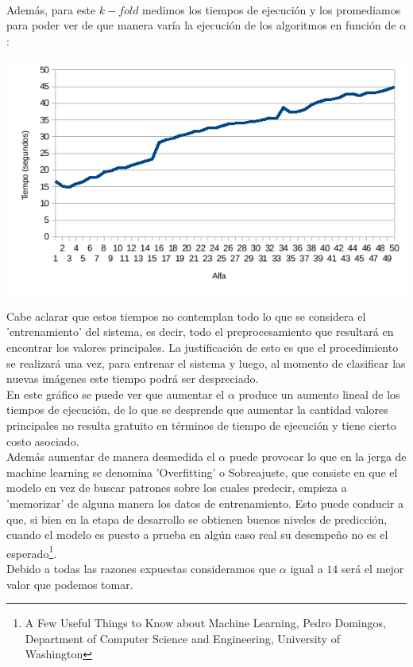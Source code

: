 \\
Además, para este $k-fold$ medimos los tiempos de ejecución y los promediamos para poder ver de que manera varía la ejecución de los algoritmos en función de $\alpha$:

\begin{center}
\includegraphics[scale=0.6]{nuevosResultados/pca/alfa/temp.png}
\end{center}


Cabe aclarar que estos tiempos no contemplan todo lo que se considera el 'entrenamiento' del sistema, es decir, todo el preprocesamiento que resultará en encontrar los valores principales. La justificación de esto es que el procedimiento se realizará una vez, para entrenar el sistema y luego, al momento de clasificar las nuevas imágenes este tiempo podrá ser despreciado.
\\
En este gráfico se puede ver que aumentar el $\alpha$ produce un aumento lineal de los tiempos de ejecución, de lo que se desprende que aumentar la cantidad valores principales no resulta gratuito en términos de tiempo de ejecución y tiene cierto costo asociado.
\\
Además aumentar de manera desmedida el $\alpha$ puede provocar lo que en la jerga de machine learning se denomina 'Overfitting' o Sobreajuste, que consiste en que el modelo en vez de buscar patrones sobre los cuales predecir, empieza a 'memorizar' de alguna manera los datos de entrenamiento. Esto puede conducir a que, si bien en la etapa de desarrollo se obtienen buenos niveles de predicción, cuando el modelo es puesto a prueba en algún caso real su desempeño no es el esperado\footnote{\label{note1}A Few Useful Things to Know about Machine Learning, Pedro Domingos, Department of Computer Science and Engineering, University of Washington}.
\\
Debido a todas las razones expuestas consideramos que $\alpha$ igual a $14$ será el mejor valor que podemos tomar.
\\
